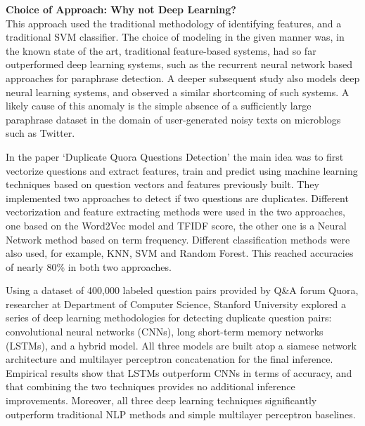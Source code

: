 \textbf{Choice of Approach: Why not Deep Learning?} \\
This approach used the traditional methodology of identifying features, and a traditional SVM classifier. The choice
of modeling in the given manner was, in the known state of the art, traditional feature-based systems, had so far outperformed deep learning systems, such as the recurrent neural network based approaches for paraphrase detection. A deeper subsequent study also models deep neural learning systems, and observed a similar shortcoming of such systems.
A likely cause of this anomaly is the simple absence of a sufficiently large paraphrase dataset in the
domain of user-generated noisy texts on microblogs such as Twitter.

In the paper `Duplicate Quora Questions Detection' \cite{Guo2017DuplicateQQ} the main idea was to first vectorize questions and extract features, train and predict using machine learning techniques based on question vectors and features previously built. They implemented two approaches to detect if two questions are duplicates. Different vectorization and feature extracting methods were used in the two approaches, one based on the Word2Vec model and \ac{TFIDF} score, the other one is a Neural Network method based on term frequency. Different classification methods were also used, for example, \ac{KNN}, \ac{SVM} and Random Forest. This reached accuracies of nearly 80\% in both two approaches.

Using a dataset of 400,000 labeled question pairs provided by Q\&A forum Quora, researcher at Department of Computer Science, Stanford University explored a series of deep learning methodologies for detecting duplicate question pairs: convolutional neural networks (CNNs), long short-term memory networks (LSTMs), and a hybrid model\cite{Addair2017DuplicateQP}. All three models are built atop a siamese network architecture and multilayer perceptron concatenation for the final inference. Empirical results show that LSTMs outperform CNNs in terms of accuracy, and that combining the two techniques provides no additional inference improvements. Moreover, all three deep learning techniques significantly outperform traditional NLP methods and simple multilayer perceptron baselines.

